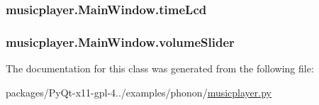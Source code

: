 \subsubsection[{time\+Lcd}]{\setlength{\rightskip}{0pt plus 5cm}musicplayer.\+Main\+Window.\+time\+Lcd}\label{classmusicplayer_1_1MainWindow_a61dc2311d27cda4cb6a337c6e95e0554}
\hypertarget{classmusicplayer_1_1MainWindow_aaaa223871b730484ff563dae272fa620}{}
\subsubsection[{volume\+Slider}]{\setlength{\rightskip}{0pt plus 5cm}musicplayer.\+Main\+Window.\+volume\+Slider}\label{classmusicplayer_1_1MainWindow_aaaa223871b730484ff563dae272fa620}


The documentation for this class was generated from the following file\+:\begin{DoxyCompactItemize}
\item 
packages/\+Py\+Qt-\/x11-\/gpl-\/4../examples/phonon/\hyperlink{musicplayer_8py}{musicplayer.\+py}\end{DoxyCompactItemize}
